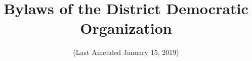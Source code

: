 \documentclass{article}
\begin{document}
\title{Bylaws of the \fortythird{} District Democratic Organization}
\date{(Last Amended January 15, 2019)}
\maketitle

\setcounter{tocdepth}{1}
\tableofcontents

\newpage{}

\end{document}

